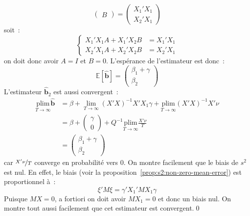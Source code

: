 \documentclass[10pt]{beamer}
\begin{document}
\begin{notes}
\[\begin{pmatrix}
      B
    \end{pmatrix} =
    \begin{pmatrix}
      X_1'X_1\\
      X_2'X_1
    \end{pmatrix}
  \]
  soit~:
  \[
    \begin{cases}
      X_1'X_1 A +X_1'X_2 B &= X_1'X_1\\
      X_2'X_1 A +X_2'X_2 B &= X_2'X_1
    \end{cases}
  \]
  on doit donc avoir $A=I$ et $B=0$. L'espérance de l'estimateur est donc~:
  \[
    \mathbb E\left[ \hat{\mathbf b} \right] =
    \begin{pmatrix}
      \beta_1 + \gamma\\ \beta_2
    \end{pmatrix}
  \]
  L'estimateur $\hat{\mathbf b}_2$ est aussi convergent~:
  \[
    \begin{split}
      \underset{T\rightarrow\infty}{\text{plim}} \hat{\mathbf b} &= \beta
    +
    \underset{T\rightarrow\infty}{\lim} (X'X)^{-1}X'X_1\gamma
                                                                   + \underset{T\rightarrow\infty}{\text{plim}} (X'X)^{-1}X'\nu\\
                                                                 &= \beta
                                                                   +
                                                                   \begin{pmatrix}
                                                                     \gamma\\
                                                                     0
                                                                   \end{pmatrix}
                                                                   + Q^{-1}\underset{T\rightarrow\infty}{\text{plim}} \frac{X'\nu}{T}\\
                                                                 &=
                                                                   \begin{pmatrix}
                                                                     \beta_1+\gamma\\
                                                                     \beta_2
                                                                   \end{pmatrix}
    \end{split}
  \]
  car $\nicefrac{X'\nu}{T}$ converge en probabilité vers 0. On montre facilement que le biais de $s^2$ est nul. En effet, le biais (voir la proposition~\ref{prop:s2:non-zero-mean-error}) est proportionnel à~:
  \[
    \xi'M\xi = \gamma'X_1'M X_1\gamma
  \]
Puisque $MX=0$, a fortiori on doit avoir $MX_1=0$ et donc un biais nul. On montre tout aussi facilement que cet estimateur est convergent.\qed
\end{notes}
\end{document}
